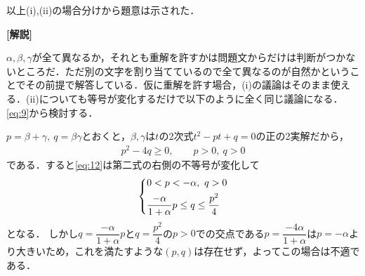 \documentclass[../../main.tex]{subfiles}
\begin{document}
\casesend

以上(i),(ii)の場合分けから題意は示された．

{\bf [解説]}

$\alpha,\beta,\gamma$が全て異なるか，それとも重解を許すかは問題文からだけは判断がつかないところだ．ただ別の文字を割り当てているので全て異なるのが自然かということでその前提で解答している．仮に重解を許す場合，(i)の議論はそのまま使える．(ii)についても等号が変化するだけで以下のように全く同じ議論になる．\cref{eq:9}から検討する．

$p=\beta+\gamma,\ q=\beta\gamma$とおくと，$\beta,\gamma$は$t$の2次式$t^2-pt+q=0$の正の2実解だから，
\begin{align}
  p^2-4q  \ge 0, \qquad p>0,\ q>0
\end{align}
である．すると\cref{eq:12}は第二式の右側の不等号が変化して
\begin{align}
  \begin{dcases}
    0<p<-\alpha,\ q>0 \\
    \dfrac{-\alpha}{1+\alpha}p \le q \le \dfrac{p^2}{4}
  \end{dcases}
\end{align}
となる．
しかし$q=\dfrac{-\alpha}{1+\alpha}p$と$q=\dfrac{p^2}{4}$の$p>0$での交点である$p=\dfrac{-4\alpha}{1+\alpha}$は$p=-\alpha$より大きいため，これを満たすような$(p,q)$は存在せず，よってこの場合は不適である．

\newpage
\end{document}
